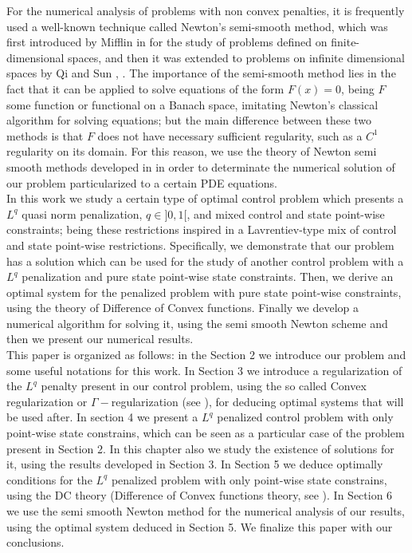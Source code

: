 \documentclass[11pt,a4paper]{amsart}
\begin{document}
 For the numerical analysis of problems with non convex penalties, it is frequently used a well-known technique called Newton's semi-smooth method, which was first introduced by Mifflin in \cite{mifflin} for the study of problems defined on finite-dimensional spaces, and then it was extended to problems on infinite dimensional spaces by Qi and Sun \cite{qi}, \cite{qisun}. The importance of the semi-smooth method lies in the fact that it can be applied to solve equations of the form $F(x)=0$, being $F$ some function or functional on a Banach space, imitating Newton's classical algorithm for solving equations; but the main difference between these two methods is that $F$ does not have necessary sufficient regularity, such as a $C^1$ regularity on its domain. For this reason, we use the theory of Newton semi smooth methods developed in \cite{ulbrich} in order to determinate the numerical solution of our problem particularized to a certain PDE equations. \\

In this work we study a certain type of optimal control problem which presents a $L^q$ quasi norm penalization, $q\in ]0,1[$, and mixed control and state point-wise constraints; being these restrictions inspired in a Lavrentiev-type mix of control and state point-wise restrictions. Specifically, we demonstrate that our problem has a solution which can be used for the study of another control problem with a $L^q$ penalization and pure state point-wise state constraints. Then, we derive an optimal system for the penalized problem with pure state point-wise constraints, using the theory of Difference of Convex functions. Finally we develop a numerical algorithm for solving it, using the semi smooth Newton scheme and then we present our numerical results.\\

This paper is organized as follows: in the Section 2 we introduce our problem and some useful notations for this work. In Section 3 we introduce a regularization of the $L^q$ penalty present in our control problem, using the so called Convex regularization or $\Gamma-$regularization (see \cite{eck}), for deducing optimal systems that will be used after. In section 4 we present a $L^q$ penalized control problem with only point-wise state constrains, which can be seen as a particular case of the problem present in Section 2. In this chapter also we study the existence of solutions for it, using the results developed in Section 3. In Section 5 we deduce optimally conditions for the $L^q$ penalized problem with only point-wise state constrains, using the DC theory (Difference of Convex functions theory, see \cite{merino, dihn}). In Section 6 we use the semi smooth Newton method for the numerical analysis of our results, using the optimal system deduced in Section 5. We finalize this paper with our conclusions.
\end{document}
